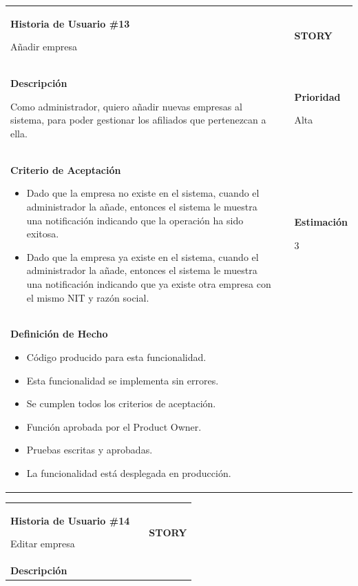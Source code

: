 \documentclass[12pt,a4paper]{article}
\begin{document}
\begin{center}
\begin{tabular}{| p{10cm} c p{2.5cm}|}
\hline 
\textbf{Historia de Usuario \#13}

Añadir empresa & & \textbf{{\Large STORY}} \\ 
\textbf{Descripción}

Como administrador, quiero añadir nuevas empresas al sistema, para
poder gestionar los afiliados que pertenezcan a ella. &  & \textbf{Prioridad}

Alta\\

\textbf{Criterio de Aceptación}

\begin{itemize}
\item Dado que la empresa no existe en el sistema, cuando el
administrador la añade, entonces el sistema le muestra una
notificación indicando que la operación ha sido exitosa.
\item Dado que la empresa ya existe en el sistema, cuando el
administrador la añade, entonces el sistema le muestra una
notificación indicando que ya existe otra empresa con el mismo
NIT y razón social.
\end{itemize} & & \textbf{Estimación}

3 \\ 

\textbf{Definición de Hecho}

\begin{itemize}
\item Código producido para esta funcionalidad.
\item Esta funcionalidad se implementa sin errores.
\item Se cumplen todos los criterios de aceptación.
\item Función aprobada por el Product Owner.
\item Pruebas escritas y aprobadas.
\item La funcionalidad está desplegada en producción.
\end{itemize} & & \\
\hline  
\end{tabular}
\vspace{5mm}

\begin{tabular}{| p{10cm} c p{2.5cm}|}
\hline 
\textbf{Historia de Usuario \#14}

Editar empresa & & \textbf{{\Large STORY}} \\ 
\textbf{Descripción}


\end{tabular}
\end{center}
\end{document}

